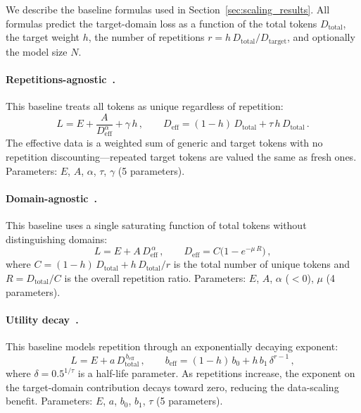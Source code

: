 We describe the baseline formulas used in Section~\ref{sec:scaling_results}.
All formulas predict the target-domain loss as a function of the total tokens $D_\text{total}$, the target weight $h$, the number of repetitions $r = h\,D_\text{total}/D_\text{target}$, and optionally the model size $N$.

\paragraph{Repetitions-agnostic~\citep{shukor2025scalinglawsoptimaldata}.}
This baseline treats all tokens as unique regardless of repetition:
\begin{equation}
  L = E + \frac{A}{D_\mathrm{eff}^\alpha} + \gamma\,h\,,
  \qquad D_\mathrm{eff} = (1-h)\,D_\text{total} + \tau\,h\,D_\text{total}\,.
\end{equation}
The effective data is a weighted sum of generic and target tokens with no repetition discounting---repeated target tokens are valued the same as fresh ones.
Parameters: $E$, $A$, $\alpha$, $\tau$, $\gamma$ (5 parameters).

\paragraph{Domain-agnostic~\citep{muennighoff2023scaling}.}
This baseline uses a single saturating function of total tokens without distinguishing domains:
\begin{equation}
  L = E + A\,D_\mathrm{eff}^{\,\alpha}\,,
  \qquad D_\mathrm{eff} = C\bigl(1 - e^{-\mu\,R}\bigr)\,,
\end{equation}
where $C = (1-h)\,D_\text{total} + h\,D_\text{total}/r$ is the total number of unique tokens and $R = D_\text{total}/C$ is the overall repetition ratio.
Parameters: $E$, $A$, $\alpha$ ($<0$), $\mu$ (4 parameters).

\paragraph{Utility decay~\citep{goyal2024scaling}.}
This baseline models repetition through an exponentially decaying exponent:
\begin{equation}
  L = E + a\,D_\text{total}^{\,b_\mathrm{eff}}\,,
  \qquad b_\mathrm{eff} = (1-h)\,b_0 + h\,b_1\,\delta^{r-1}\,,
\end{equation}
where $\delta = 0.5^{1/\tau}$ is a half-life parameter.
As repetitions increase, the exponent on the target-domain contribution decays toward zero, reducing the data-scaling benefit.
Parameters: $E$, $a$, $b_0$, $b_1$, $\tau$ (5 parameters).

